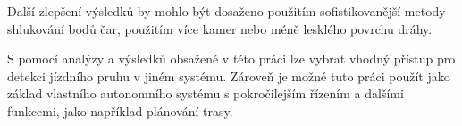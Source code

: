 \documentclass[czech, bc, kky, he, iso690numb]{fasthesis}
\begin{document}
        Další zlepšení výsledků by mohlo být dosaženo použitím sofistikovanější metody shlukování bodů čar, použitím více kamer nebo méně lesklého povrchu dráhy.
        
        S pomocí analýzy a výsledků obsažené v této práci lze vybrat vhodný přístup pro detekci jízdního pruhu v jiném systému. Zároveň je možné tuto práci použít jako základ vlastního autonomního systému s pokročilejším řízením a dalšími funkcemi, jako například plánování trasy.
                    
    \backmatter
    \printbibliography
    \listoffigures
    \listoftables
    \backpage
\end{document}
